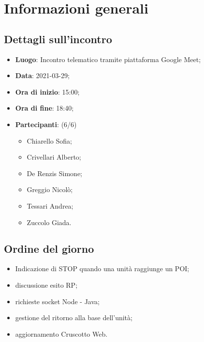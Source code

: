 \section{Informazioni generali}

\subsection{Dettagli sull'incontro}
\begin{itemize}
\item \textbf{Luogo}: Incontro telematico tramite piattaforma Google Meet;
\item \textbf{Data}: 2021-03-29;
\item \textbf{Ora di inizio}: 15:00;
\item \textbf{Ora di fine}: 18:40;
\item \textbf{Partecipanti}: (6/6) 
\begin{itemize}
	\item Chiarello Sofia;
	\item Crivellari Alberto;
	\item De Renzis Simone;
	\item Greggio Nicolò;
	\item Tessari Andrea;
	\item Zuccolo Giada.
\end{itemize}
\end{itemize}

\subsection{Ordine del giorno}
\begin{itemize}
	\item Indicazione di STOP quando una unità raggiunge un POI;
	\item discussione esito RP;
	\item richieste socket Node - Java;
	\item gestione del ritorno alla base dell'unità;
	\item aggiornamento Cruscotto Web.
\end{itemize}


